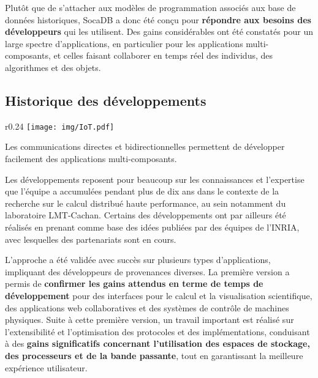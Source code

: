 \documentclass[a4paper,10pt]{scrreprt}
\begin{document}
            \medskip
            Plutôt que de s'attacher aux modèles de programmation associés aux base de données historiques, SocaDB a donc été conçu pour \textbf{répondre aux besoins des développeurs} qui les utilisent. Des gains considérables ont été constatés pour un large spectre d'applications, en particulier pour les applications multi-composants, et celles faisant collaborer en temps réel des individus, des algorithmes et des objets.
            
        \subsection{Historique des développements}

            \begin{wrapfigure}{r}{0.24\textwidth}
                \hfill
                \vspace{-1.9em}
                \texttt{[image: img/IoT.pdf]}
                \begin{center}
                \begin{scriptsize}
                    Les communications directes et bidirectionnelles permettent de développer facilement des applications multi-composants.
                \end{scriptsize}
                \end{center}
            \end{wrapfigure}
            
        
            Les développements reposent pour beaucoup sur les connaissances et l'expertise que l'équipe a accumulées pendant plus de dix ans dans le contexte de la recherche sur le calcul distribué haute performance, au sein notamment du laboratoire LMT-Cachan. Certains des développements ont par ailleurs été réalisés en prenant comme base des idées publiées par des équipes de l'INRIA, avec lesquelles des partenariats sont en cours.

            \medskip
            L'approche a été validée avec succès sur plusieurs types d'applications, impliquant des développeurs de provenances diverses. La première version a permis de \textbf{confirmer les gains attendus en terme de temps de développement} pour des interfaces pour le calcul et la visualisation scientifique, des applications web collaboratives et des systèmes de contrôle de machines physiques. Suite à cette première version, un travail important est réalisé sur l'extensibilité et l'optimisation des protocoles et des implémentations, conduisant à des \textbf{gains significatifs concernant l'utilisation des espaces de stockage, des processeurs et de la bande passante}, tout en garantissant la meilleure expérience utilisateur.
            
\end{document}

